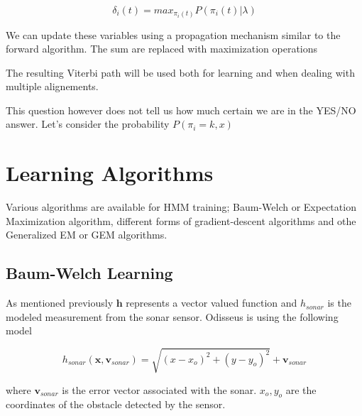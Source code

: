\begin{equation}
\delta_i(t) = max_{\pi_i(t)}P(\pi_i(t)|\lambda)
\end{equation}


We can update these variables using a propagation mechanism similar to the forward algorithm.
The sum are replaced with maximization operations


The resulting Viterbi path will be used both for learning and when dealing with multiple alignements.

This question however does not tell us how much certain we are in the YES/NO answer. 
Let's consider the probability $P(\pi_i=k,x)$ 


\section{Learning Algorithms}
Various algorithms are available for HMM training; Baum-Welch or Expectation Maximization algorithm, different forms
of gradient-descent algorithms and othe Generalized EM or GEM algorithms.

\subsection{Baum-Welch Learning}
\label{baum_welch_learning}

As mentioned previously $\mathbf{h}$ represents a vector valued function and $h_{sonar}$ is the modeled measurement from the
sonar sensor. Odisseus is using the following model

\begin{equation}
h_{sonar}(\mathbf{x}, \mathbf{v}_{sonar}) = \sqrt{(x - x_o)^2 + (y - y_o)^2} +  \mathbf{v}_{sonar}
\label{sonar_h}
\end{equation} 

where $\mathbf{v}_{sonar}$ is the error vector associated with the sonar. $x_o, y_o$ are the coordinates of the
obstacle detected by the sensor.

